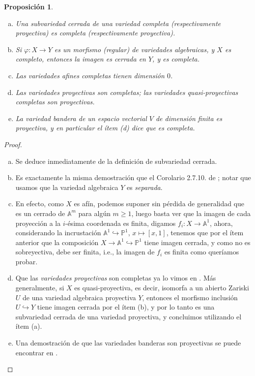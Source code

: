 \documentclass[spanish,10pt]{amsart}
\newtheorem{proposition}[theorem]{Proposición}
\theoremstyle{definition}
\theoremstyle{remark}
\numberwithin{equation}{section}
\newcommand{\afine}[1]{\mathbb{A}^{#1}}
\newcommand{\projective}[1]{\mathbb{P}^{#1}}
\begin{document}
\begin{proposition}\label{proposicion:varios hechos sobre variedades completas}
\begin{enumerate}[(a)]
\item Una subvariedad cerrada de una variedad completa (respectivamente proyectiva) es completa (respectivamente proyectiva).
\item Si $\varphi : X \to Y$ es un morfismo (regular) de variedades algebraicas, y $X$ es completo, entonces la imagen es cerrada en $Y$, y es completa.
\item Las variedades afines completas tienen dimensión $0$.
\item Las variedades proyectivas son completas; las variedades quasi-proyectivas completas son proyectivas.
\item La \textit{variedad bandera} de un espacio vectorial $V$ de dimensión finita es proyectiva, y en particular el ítem (d) dice que es completa.
\end{enumerate}
\end{proposition}
\begin{proof}
\begin{enumerate}[(a)]
\item Se deduce inmediatamente de la definición de subvariedad cerrada.
\item Es exactamente la misma demostración que el Corolario 2.7.10. de \cite{notas_pedro}; notar que usamos que la variedad algebraica $Y$ es \textit{separada}.
\item En efecto, como $X$ es afín, podemos suponer sin pérdida de generalidad que es un cerrado de $\afine m$ para algún $m \geq 1$, luego basta ver que la imagen de cada proyección a la $i$-ésima coordenada es finita, digamos $f_i : X \to \afine 1$, ahora, considerando la incrustación $\afine 1 \hookrightarrow \projective 1$, $x \mapsto [x, 1]$, tenemos que por el ítem anterior que la composición $X \to \afine 1 \hookrightarrow \projective 1$ tiene imagen cerrada, y como no es sobreyectiva, debe ser finita, i.e., la imagen de $f_i$ es finita como queríamos probar.
\item Que las \textit{variedades proyectivas} son completas ya lo vimos en \cite[Teorema \emph{2.7.9}]{notas_pedro}. Más generalmente, si $X$ es quasi-proyectiva, es decir, isomorfa a un abierto Zariski $U$ de una variedad algebraica proyectiva $Y$, entonces el morfismo inclusión $U \hookrightarrow Y$ tiene imagen cerrada por el ítem (b), y por lo tanto es una subvariedad cerrada de una variedad proyectiva, y concluimos utilizando el ítem (a).
\item Una demostración de que las variedades banderas son proyectivas se puede encontrar en \cite[Teorema 3.3.11]{geckMeinolf2013introductionToAlgebraicGeometryAndAlgebraicGroups}.
\end{enumerate}
\end{proof}
\end{document}
